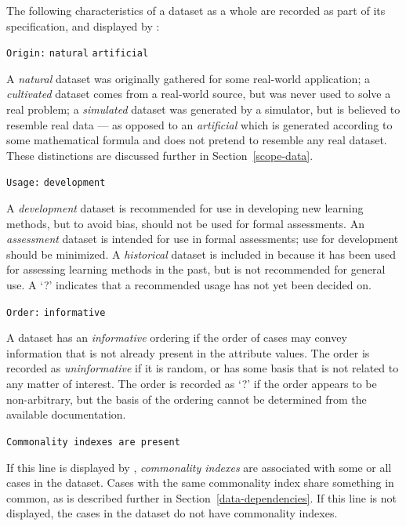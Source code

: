 The following characteristics of a dataset as a whole are recorded
as part of its specification, and displayed by \dinfo{}:\vspace{-3pt}%
\begin{list}{}{%
\setlength{\leftmargin}{1.1in}%
\setlength{\labelwidth}{0.7in}%
\setlength{\labelsep}{0.1in}%
}
\item[{\tt Origin:}\hfill]
   {\tt natural}   \OR
   {\tt artificial}

A \emph{natural} dataset was originally gathered for some real-world
application; a \emph{cultivated} dataset comes from a real-world
source, but was never used to solve a real problem; a \emph{simulated}
dataset was generated by a simulator, but is believed to resemble real
data --- as opposed to an \emph{artificial} which is generated
according to some mathematical formula and does not pretend to
resemble any real dataset. These distinctions are discussed further in
Section~\ref{scope-data}.

\item[{\tt Usage:}\hfill]
  {\tt development}  

A \emph{development} dataset is recommended for use in developing new
learning methods, but to avoid bias, should not be used for formal
assessments.  An \emph{assessment} dataset is intended for use in
formal assessments; use for development should be minimized.  A
\emph{historical} dataset is included in \delve{} because it has been
used for assessing learning methods in the past, but is not
recommended for general use.  A `?' indicates that a recommended usage
has not yet been decided on.

\item[{\tt Order:}\hfill] 
  {\tt informative}  

A dataset has an \emph{informative} ordering if the order of cases
may convey information that is not already present in the attribute
values.  The order is recorded as \emph{uninformative} if it is
random, or has some basis that is not related to any matter of
interest.  The order is recorded as `?' if the order appears to be
non-arbitrary, but the basis of the ordering cannot be determined from
the available documentation.

\item[{\tt Commonality indexes are present}] ~

If this line is displayed by \dinfo, {\em commonality indexes\/} are
associated with some or all cases in the dataset.  Cases with the same
commonality index share something in common, as is described further
in Section~\ref{data-dependencies}.  If this line is not displayed,
the cases in the dataset do not have commonality indexes.\vspace{-3pt}
\end{list}

